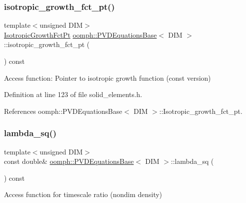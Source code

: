 \subsubsection{\texorpdfstring{isotropic\+\_\+growth\+\_\+fct\+\_\+pt()}{isotropic\_growth\_fct\_pt()}\hspace{0.1cm}{\footnotesize\ttfamily [2/2]}}
{\footnotesize\ttfamily template$<$unsigned D\+IM$>$ \\
\hyperlink{classoomph_1_1PVDEquationsBase_a59fc7069e0330c399ff53aebb6c67729}{Isotropic\+Growth\+Fct\+Pt} \hyperlink{classoomph_1_1PVDEquationsBase}{oomph\+::\+P\+V\+D\+Equations\+Base}$<$ D\+IM $>$\+::isotropic\+\_\+growth\+\_\+fct\+\_\+pt (\begin{DoxyParamCaption}{ }\end{DoxyParamCaption}) const\hspace{0.3cm}{\ttfamily [inline]}}



Access function\+: Pointer to isotropic growth function (const version) 



Definition at line 123 of file solid\+\_\+elements.\+h.



References oomph\+::\+P\+V\+D\+Equations\+Base$<$ D\+I\+M $>$\+::\+Isotropic\+\_\+growth\+\_\+fct\+\_\+pt.

\mbox{\label{classoomph_1_1PVDEquationsBase_af734fb69def2791d9b6f9a97d9aa9b8f}} 
\subsubsection{\texorpdfstring{lambda\+\_\+sq()}{lambda\_sq()}}
{\footnotesize\ttfamily template$<$unsigned D\+IM$>$ \\
const double\& \hyperlink{classoomph_1_1PVDEquationsBase}{oomph\+::\+P\+V\+D\+Equations\+Base}$<$ D\+IM $>$\+::lambda\+\_\+sq (\begin{DoxyParamCaption}{ }\end{DoxyParamCaption}) const\hspace{0.3cm}{\ttfamily [inline]}}



Access function for timescale ratio (nondim density) 



